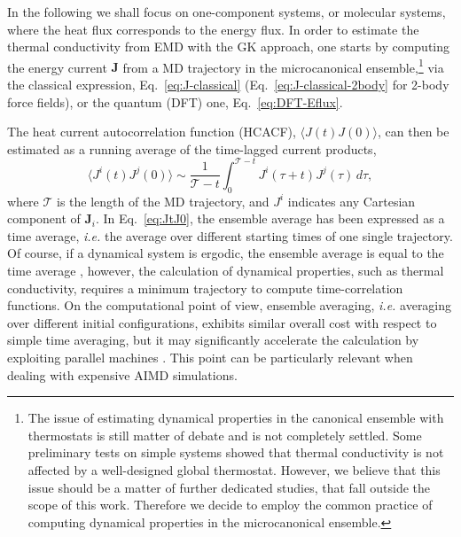 \begin{LEtext}
In the following we shall focus on one-component systems, or molecular systems, where the heat flux corresponds to the energy flux. 
In order to estimate the thermal conductivity from EMD with the GK approach, one starts by computing the energy current $\mathbf{J}$ from a MD trajectory in the microcanonical ensemble,\footnote{The issue of estimating dynamical properties in the canonical ensemble with thermostats is still matter of debate and is not completely settled. Some preliminary tests on simple systems showed that thermal conductivity is not affected by a well-designed global thermostat. However, we believe that this issue should be a matter of further dedicated studies, that fall outside the scope of this work. Therefore we decide to employ the common practice of computing dynamical properties in the microcanonical ensemble.} 
via the classical expression, Eq.~\eqref{eq:J-classical} (Eq.~\eqref{eq:J-classical-2body} for 2-body force fields), or the quantum (DFT) one, Eq.~\eqref{eq:DFT-Eflux}.

The heat current autocorrelation function (HCACF), $\langle J(t)J(0)\rangle$, can then be estimated as a running average of the time-lagged current products, 
\begin{equation}
    \langle J^i(t) J^j(0)\rangle \sim \frac{1}{\mathcal{T}-t} \int_0^{\mathcal{T}-t} J^i(\tau+t) J^j(\tau) \, d\tau , \label{eq:JtJ0}
\end{equation}
where $\mathcal{T}$ is the length of the MD trajectory, and $J^i$ indicates any Cartesian component of $\mathbf{J}_i$. 
In Eq.~\eqref{eq:JtJ0}, the ensemble average has been expressed as a time average, \emph{i.e.} the average over different starting times of one single trajectory. Of course, if a dynamical system is ergodic, the ensemble average is equal to the time average \cite{Frenkel2001}, however, the calculation of dynamical properties, such as thermal conductivity, requires a minimum trajectory to compute time-correlation functions. On the computational point of view, ensemble averaging, \emph{i.e.} averaging over different initial configurations, exhibits similar overall cost with respect to simple time averaging, but it may significantly accelerate the calculation by exploiting parallel machines \cite{Gordiz2015}. This point can be particularly relevant when dealing with expensive AIMD simulations.



\end{LEtext}
